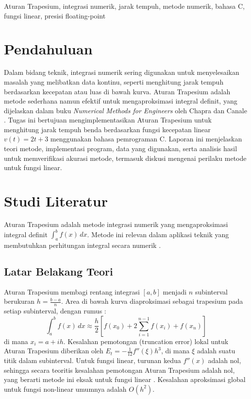 \documentclass[conference]{IEEEtran}
\begin{document}
\begin{IEEEkeywords}
Aturan Trapesium, integrasi numerik, jarak tempuh, metode numerik, bahasa C, fungsi linear, presisi floating-point
\end{IEEEkeywords}

\section{Pendahuluan}
Dalam bidang teknik, integrasi numerik sering digunakan untuk menyelesaikan masalah yang melibatkan data kontinu, seperti menghitung jarak tempuh berdasarkan kecepatan atau luas di bawah kurva. Aturan Trapesium adalah metode sederhana namun efektif untuk mengaproksimasi integral definit, yang dijelaskan dalam buku \textit{Numerical Methods for Engineers} oleh Chapra dan Canale \cite{b1}. Tugas ini bertujuan mengimplementasikan Aturan Trapesium untuk menghitung jarak tempuh benda berdasarkan fungsi kecepatan linear \( v(t) = 2t + 3 \) menggunakan bahasa pemrograman C. Laporan ini menjelaskan teori metode, implementasi program, data yang digunakan, serta analisis hasil untuk memverifikasi akurasi metode, termasuk diskusi mengenai perilaku metode untuk fungsi linear.

\section{Studi Literatur}
Aturan Trapesium adalah metode integrasi numerik yang mengaproksimasi integral definit \( \int_a^b f(x) \, dx \). Metode ini relevan dalam aplikasi teknik yang membutuhkan perhitungan integral secara numerik \cite{b1}.

\subsection{Latar Belakang Teori}
Aturan Trapesium membagi rentang integrasi \([a, b]\) menjadi \( n \) subinterval berukuran \( h = \frac{b-a}{n} \). Area di bawah kurva diaproksimasi sebagai trapesium pada setiap subinterval, dengan rumus \cite{b1}:
\begin{equation}
\int_a^b f(x) \, dx \approx \frac{h}{2} \left[ f(x_0) + 2 \sum_{i=1}^{n-1} f(x_i) + f(x_n) \right]
\label{eq:trapezoidal}
\end{equation}
di mana \( x_i = a + i h \). Kesalahan pemotongan (truncation error) lokal untuk Aturan Trapesium diberikan oleh \( E_t = -\frac{1}{12}f''(\xi)h^3 \), di mana \( \xi \) adalah suatu titik dalam subinterval. Untuk fungsi linear, turunan kedua \( f''(x) \) adalah nol, sehingga secara teoritis kesalahan pemotongan Aturan Trapesium adalah nol, yang berarti metode ini eksak untuk fungsi linear \cite{b1}. Kesalahan aproksimasi global untuk fungsi non-linear umumnya adalah \( O(h^2) \).
\end{document}
